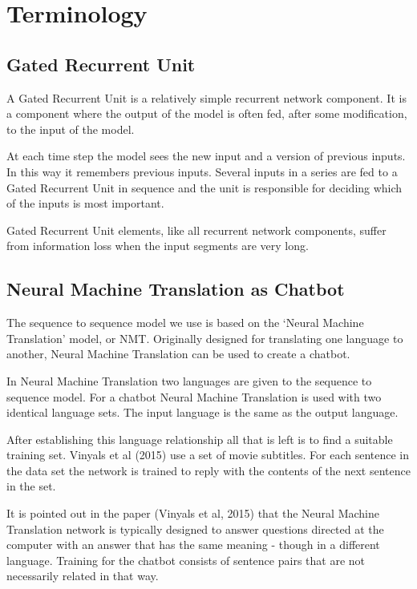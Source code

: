 \chapter{Terminology}

\section{Gated Recurrent Unit}

A Gated Recurrent Unit is a relatively simple recurrent network component. It is a component where the output of the model is often fed, after some modification, to the input of the model. 

At each time step the model sees the new input and a version of previous inputs. In this way it remembers previous inputs. Several inputs in a series are fed to a Gated Recurrent Unit in sequence and the unit is responsible for deciding which of the inputs is most important.

Gated Recurrent Unit elements, like all recurrent network components, suffer from information loss when the input segments are very long.

\section{Neural Machine Translation as Chatbot}

The sequence to sequence model we use is based on the \textquoteleft Neural Machine Translation\textquoteright{} model, or \ac{NMT}. Originally designed for translating one language to another, Neural Machine Translation can be used to create a chatbot.

In Neural Machine Translation two languages are given to the sequence to sequence model. For a chatbot Neural Machine Translation is used with two identical language sets. The input language is the same as the output language.

After establishing this language relationship all that is left is to find a suitable training set. Vinyals et al (2015)\cite{DBLP:journals/corr/VinyalsL15} use a set of movie subtitles. For each sentence in the data set the network is trained to reply with the contents of the next sentence in the set.

It is pointed out in the paper (Vinyals et al, 2015)\cite{DBLP:journals/corr/VinyalsL15} that the Neural Machine Translation network is typically designed to answer questions directed at the computer with an answer that has the same meaning - though in a different language. Training for the chatbot consists of sentence pairs that are not necessarily related in that way. 

